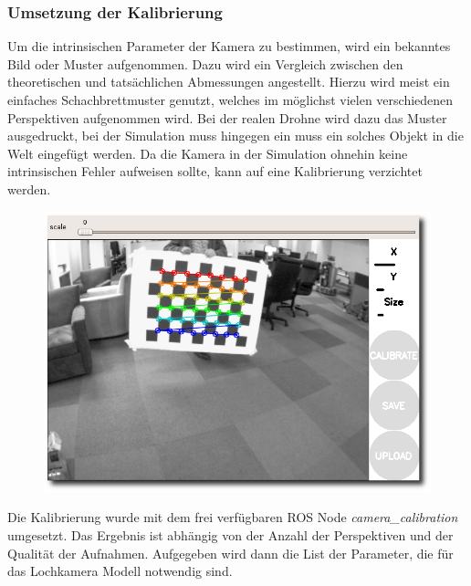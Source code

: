 \subsubsection*{Umsetzung der Kalibrierung}
Um die intrinsischen Parameter der Kamera zu bestimmen, wird ein bekanntes Bild oder Muster aufgenommen. Dazu wird ein Vergleich zwischen den theoretischen und tatsächlichen Abmessungen angestellt. Hierzu wird meist ein einfaches Schachbrettmuster genutzt, welches im möglichst vielen verschiedenen Perspektiven aufgenommen wird. Bei der realen Drohne wird dazu das Muster ausgedruckt, bei der Simulation muss hingegen ein muss ein solches Objekt in die Welt eingefügt werden. Da die Kamera in der Simulation ohnehin keine intrinsischen Fehler aufweisen sollte, kann auf eine Kalibrierung verzichtet werden. \newline

\begin{figure}[ht]
	\centering
	\includegraphics[scale=0.4]{Bilder/calibrationChecker.png}
	\label{fig:calibrationChecker}
\end{figure}

Die Kalibrierung wurde mit dem frei verfügbaren ROS Node \textit{camera\_calibration} umgesetzt. Das Ergebnis ist abhängig von der Anzahl der Perspektiven und der Qualität der Aufnahmen. Aufgegeben wird dann die List der Parameter, die für das Lochkamera Modell notwendig sind.


